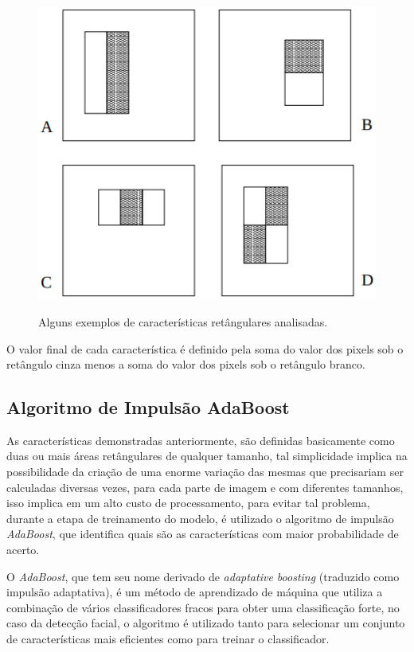 \begin{figure}[htb]
    \centering
    \caption{Alguns exemplos de características retângulares analisadas.}
    \includegraphics[scale=.5]{figs/features.png}
    \label{fig:features}
 \end{figure}

 O valor final de cada característica é definido pela soma do valor dos pixels sob o retângulo cinza menos a soma do valor dos pixels sob o retângulo branco.

\subsection{Algoritmo de Impulsão AdaBoost}

As características demonstradas anteriormente, são definidas basicamente como duas ou mais áreas retângulares de qualquer tamanho, tal simplicidade implica na possibilidade da criação de uma enorme variação das mesmas que precisariam ser calculadas diversas vezes, para cada parte de imagem e com diferentes tamanhos, isso implica em um alto custo de processamento, para evitar tal problema, durante a etapa de treinamento do modelo, é utilizado o algoritmo de impulsão \textit{AdaBoost}, que identifica quais são as características com maior probabilidade de acerto.

O \textit{AdaBoost}, que tem seu nome derivado de \textit{adaptative boosting} (traduzido como impulsão adaptativa), é um método de aprendizado de máquina que utiliza a combinação de vários classificadores fracos para obter uma classificação forte, no caso da detecção facial, o algoritmo é utilizado tanto para selecionar um conjunto de características mais eficientes como para treinar o classificador. \cite{fabio-luciana-2015}

